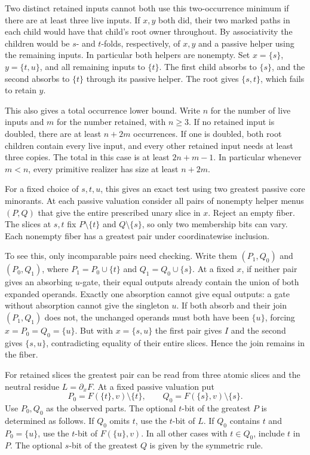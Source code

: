 Two distinct retained inputs cannot both use this
two-occurrence minimum if there are at least three
live inputs. If $x,y$ both did, their two marked
paths in each child would have that child's root
owner throughout. By associativity the children
would be $s$- and $t$-folds, respectively, of
$x,y$ and a passive helper using the remaining
inputs. In particular both helpers are nonempty.
Set $x=\{s\}$, $y=\{t,u\}$, and all remaining
inputs to $\{t\}$. The first child absorbs to
$\{s\}$, and the second absorbs to $\{t\}$
through its passive helper. The root gives
$\{s,t\}$, which fails to retain $y$.

This also gives a total occurrence lower bound.
Write $n$ for the number of live inputs and $m$
for the number retained, with $n\ge3$. If no
retained input is doubled, there are at least
$n+2m$ occurrences. If one is doubled, both root
children contain every live input, and every
other retained input needs at least three copies.
The total in this case is at least $2n+m-1$.
In particular whenever $m<n$, every primitive
realizer has size at least $n+2m$.

For a fixed choice of $s,t,u$, this gives an exact
test using two greatest passive core minorants.
At each passive valuation consider all pairs of
nonempty helper menus $(P,Q)$ that give the entire
prescribed unary slice in $x$. Reject an empty
fiber. The slices at $s,t$ fix $P\setminus\{t\}$
and $Q\setminus\{s\}$, so only two membership
bits can vary. Each nonempty fiber has a greatest
pair under coordinatewise inclusion.

To see this, only incomparable pairs need checking.
Write them $(P_1,Q_0)$ and $(P_0,Q_1)$, where
$P_1=P_0\cup\{t\}$ and $Q_1=Q_0\cup\{s\}$.
At a fixed $x$, if neither pair gives an absorbing
$u$-gate, their equal outputs already contain the
union of both expanded operands. Exactly one
absorption cannot give equal outputs: a gate
without absorption cannot give the singleton $u$.
If both absorb and their join $(P_1,Q_1)$ does
not, the unchanged operands must both have been
$\{u\}$, forcing $x=P_0=Q_0=\{u\}$. But with
$x=\{s,u\}$ the first pair gives $I$ and the
second gives $\{s,u\}$, contradicting equality of
their entire slices. Hence the join remains in
the fiber.

For retained slices the greatest pair can be read
from three atomic slices and the neutral residue
$L=\partial_x F$. At a fixed passive valuation put
\[
 P_0=F(\{t\},v)\setminus\{t\},\qquad
 Q_0=F(\{s\},v)\setminus\{s\}.
\]
Use $P_0,Q_0$ as the observed parts. The optional
$t$-bit of the greatest $P$ is determined as follows.
If $Q_0$ omits $t$, use the $t$-bit of $L$.
If $Q_0$ contains $t$ and $P_0=\{u\}$, use the
$t$-bit of $F(\{u\},v)$. In all other cases with
$t\in Q_0$, include $t$ in $P$. The optional
$s$-bit of the greatest $Q$ is given by the
symmetric rule.


